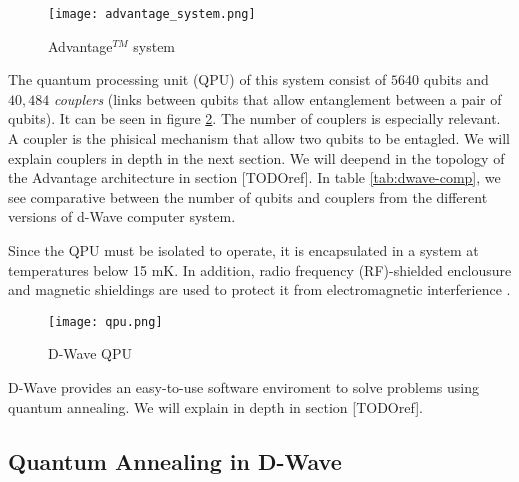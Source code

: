 \begin{figure}[h]
	\texttt{[image: advantage\_system.png]}
	\centering
	\caption{Advantage$^{TM}$ system}
	\label{fig:advantage}
\end{figure}

The quantum processing unit (QPU) of this system consist of $5640$ qubits and $40,484$ \emph{couplers} (links between qubits that allow entanglement between a pair of qubits). It can be seen in figure \ref{fig:QPU}. The number of couplers is especially relevant. A coupler is the phisical mechanism that allow two qubits to be entagled. We will explain couplers in depth in the next section. We will deepend in the topology of the Advantage architecture in section [TODOref]. In table \ref{tab:dwave-comp}, we see comparative between the number of qubits and couplers from the different versions of d-Wave computer system.

\begin{table}[h]
	\centering
	\caption{D-Wave historical comparison \cite{DwaveWikipedia}}
	\label{tab:dwave-comp}
\end{table}

Since the QPU must be isolated to operate, it is encapsulated in a system at temperatures below 15 mK. In addition, radio frequency (RF)-shielded enclousure and magnetic shieldings are used to protect it from electromagnetic interferience \cite{DWaveDoc}.

\begin{figure}[h]
	\texttt{[image: qpu.png]}
	\centering
	\caption{D-Wave QPU}
	\label{fig:QPU}
\end{figure}

D-Wave provides an easy-to-use software enviroment to solve problems using quantum annealing. We will explain in depth in section [TODOref].


\subsection{Quantum Annealing in D-Wave}
\label{quantum-annealing-dwave}



